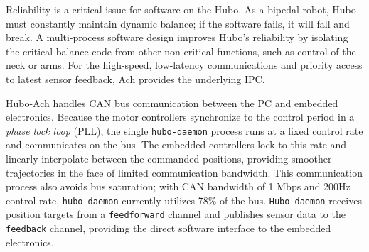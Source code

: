 Reliability is a critical issue for software on the Hubo.  As a
bipedal robot, Hubo must constantly maintain dynamic balance; if the
software fails, it will fall and break.  A multi-process software
design improves Hubo's reliability by isolating the critical balance
code from other non-critical functions, such as control of the neck or
arms.  For the high-speed, low-latency communications and priority
access to latest sensor feedback, Ach provides the underlying IPC.


Hubo-Ach handles CAN bus communication between the PC and embedded
electronics.  Because the motor controllers synchronize to the control
period in a \emph{phase lock loop} (PLL), the single {\tt hubo-daemon}
process runs at a fixed control rate and communicates on the bus.  The
embedded controllers lock to this rate and linearly interpolate
between the commanded positions, providing smoother trajectories in
the face of limited communication bandwidth.  This communication
process also avoids bus saturation; with CAN bandwidth of 1 Mbps and
200Hz control rate, {\tt hubo-daemon} currently utilizes 78\% of the
bus.  {\tt Hubo-daemon} receives position targets from a
{\tt feedforward} channel and publishes sensor data to the
{\tt feedback} channel, providing the direct software interface to
the embedded electronics.

